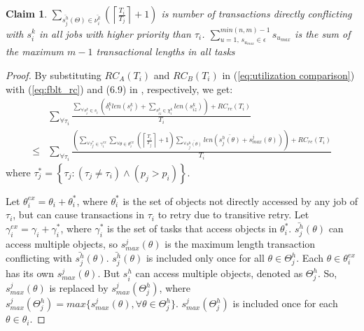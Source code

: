 \documentclass[prodmode,acmtecs]{acmsmall}
\newtheorem{clm}{Claim}
\begin{document}
\begin{compactenum}
\begin{clm}
$\sum_{\bar{s_{j}^{h}}(\Theta)\in \bar{\nu_{i}^{k}}}\left(\left\lceil \frac{T_{i}}{T_{j}}\right\rceil +1\right)$ is number of transactions directly conflicting with $s_{i}^{k}$ in all jobs with higher priority than $\tau_{i}$. $\sum_{u=1,\,s_{u_{max}}\in \epsilon}^{min(n,m)-1} s_{u_{max}}$ is the sum of the maximum $m-1$ transactional lengths in all tasks
\end{clm}
%
\begin{proof}
By substituting $RC_{A}(T_{i})$ and $RC_{B}(T_{i})$ in (\ref{eq:utilization comparison})
with (\ref{eq:fblt_rc}) and (6.9) in \cite{shambake_phd_proposal}, respectively, we get:
\begin{eqnarray}
 & \sum_{\forall\tau_{i}}\frac{\sum_{\forall s_{i}^{k}\in s_{i}}\left(\delta_i^klen(s_{i}^{k})+\sum_{s_{iz}^k\in \chi_i^k} len(s_{iz}^{k})\right)+RC_{re}(T_{i})}{T_{i}}\label{eq:fblt_rcm_comparison_1}\\
\le & \sum_{\forall\tau_{i}}\frac{\left(\sum_{\forall\tau_{j}^{*}\in\gamma_{i}^{ex}}\sum_{\forall\theta\in\theta_{i}^{ex}}\left(\left\lceil \frac{T_{i}}{T_{j}}\right\rceil +1\right)\sum_{\forall\bar{s_{j}^{h}(\theta)}}len\left(\bar{s_{j}^{h}(\theta)}+s_{max}^{j}(\theta)\right)\right)+RC_{re}(T_{i})}{T_{i}}\nonumber 
\end{eqnarray}
where $\tau_{j}^{*}=\left\{ \tau_{j}:\left(\tau_{j}\ne\tau_{i}\right)\wedge\left(p_{j}>p_{i}\right)\right\} $.


Let $\theta_{i}^{ex}=\theta_{i}+\theta_{i}^{*}$, where $\theta_{i}^{*}$
is the set of objects not directly accessed by any job of $\tau_{i}$, but can cause transactions in $\tau_{i}$ to retry due to transitive retry.
%
Let $\gamma_{i}^{ex}=\gamma_{i}+\gamma_{i}^{*}$, where $\gamma_{i}^{*}$
is the set of tasks that access objects in $\theta_{i}^{*}$. $\bar{s_{j}^{h}}(\theta)$
can access multiple objects, so $s_{max}^{j}(\theta)$ is the maximum
length transaction conflicting with $\bar{s_{j}^{h}}(\theta)$. $\bar{s_{j}^{h}}(\theta)$ is included only once for all $\theta \in \Theta_j^h$. Each $\theta \in \theta_i^{ex}$ has its own $s_{max}^j(\theta)$. But $s_i^h$ can access multiple objects, denoted as $\Theta_j^h$. So, $s_{max}^j(\theta)$ is replaced by $s_{max}^j(\Theta_j^h)$, where $s_{max}^j(\Theta_j^h)=max\{s_{max}^j(\theta),\forall \theta \in \Theta_j^h\}$. $s_{max}^j(\Theta_j^h)$ is included once for each $\theta \in \theta_i$. 



\end{proof}
\end{compactenum}
\end{document}

